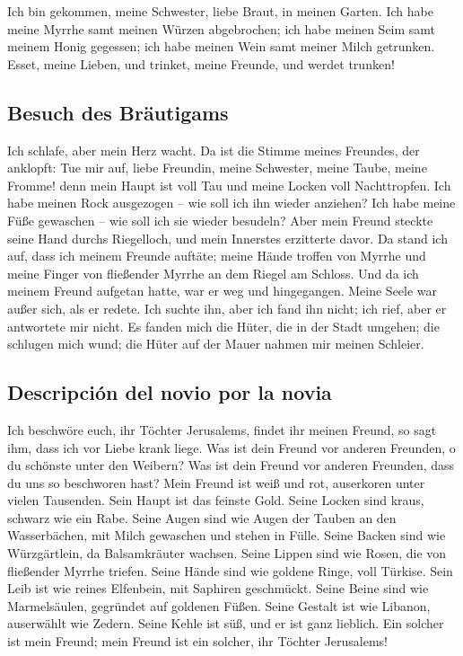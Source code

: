  Ich bin gekommen, meine Schwester, liebe Braut, in meinen
Garten. Ich habe meine Myrrhe samt meinen Würzen abgebrochen; ich habe
meinen Seim samt meinem Honig gegessen; ich habe meinen Wein samt meiner
Milch getrunken. Esset, meine Lieben, und trinket, meine Freunde, und
werdet trunken!

\hypertarget{besuch-des-bruxe4utigams}{%
\subsection{Besuch des Bräutigams}\label{besuch-des-bruxe4utigams}}

 Ich schlafe, aber mein Herz wacht. Da ist die Stimme
meines Freundes, der anklopft: Tue mir auf, liebe Freundin, meine
Schwester, meine Taube, meine Fromme! denn mein Haupt ist voll Tau und
meine Locken voll Nachttropfen.  Ich habe meinen Rock
ausgezogen -- wie soll ich ihn wieder anziehen? Ich habe meine Füße
gewaschen -- wie soll ich sie wieder besudeln?  Aber mein
Freund steckte seine Hand durchs Riegelloch, und mein Innerstes
erzitterte davor.  Da stand ich auf, dass ich meinem
Freunde auftäte; meine Hände troffen von Myrrhe und meine Finger von
fließender Myrrhe an dem Riegel am Schloss.  Und da ich
meinem Freund aufgetan hatte, war er weg und hingegangen. Meine Seele
war außer sich, als er redete. Ich suchte ihn, aber ich fand ihn nicht;
ich rief, aber er antwortete mir nicht.  Es fanden mich
die Hüter, die in der Stadt umgehen; die schlugen mich wund; die Hüter
auf der Mauer nahmen mir meinen Schleier.

\hypertarget{descripciuxf3n-del-novio-por-la-novia}{%
\subsection{Descripción del novio por la
novia}\label{descripciuxf3n-del-novio-por-la-novia}}

 Ich beschwöre euch, ihr Töchter Jerusalems, findet ihr
meinen Freund, so sagt ihm, dass ich vor Liebe krank liege.
 Was ist dein Freund vor anderen Freunden, o du schönste
unter den Weibern? Was ist dein Freund vor anderen Freunden, dass du uns
so beschworen hast?  Mein Freund ist weiß und rot,
auserkoren unter vielen Tausenden.  Sein Haupt ist das
feinste Gold. Seine Locken sind kraus, schwarz wie ein Rabe.
 Seine Augen sind wie Augen der Tauben an den
Wasserbächen, mit Milch gewaschen und stehen in Fülle. 
Seine Backen sind wie Würzgärtlein, da Balsamkräuter wachsen. Seine
Lippen sind wie Rosen, die von fließender Myrrhe triefen.
 Seine Hände sind wie goldene Ringe, voll Türkise. Sein
Leib ist wie reines Elfenbein, mit Saphiren geschmückt. 
Seine Beine sind wie Marmelsäulen, gegründet auf goldenen Füßen. Seine
Gestalt ist wie Libanon, auserwählt wie Zedern.  Seine
Kehle ist süß, und er ist ganz lieblich. Ein solcher ist mein Freund;
mein Freund ist ein solcher, ihr Töchter Jerusalems!

